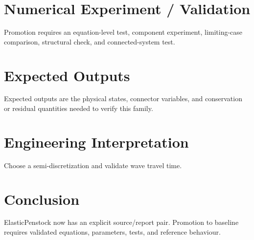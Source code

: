 \documentclass[10pt,a4paper]{article}
\begin{document}
\section{Numerical Experiment / Validation}Promotion requires an equation-level test, component experiment, limiting-case comparison, structural check, and connected-system test.
\section{Expected Outputs}Expected outputs are the physical states, connector variables, and conservation or residual quantities needed to verify this family.
\section{Engineering Interpretation}Choose a semi-discretization and validate wave travel time.
\section*{Conclusion}ElasticPenstock now has an explicit source/report pair. Promotion to baseline requires validated equations, parameters, tests, and reference behaviour.
\end{document}
